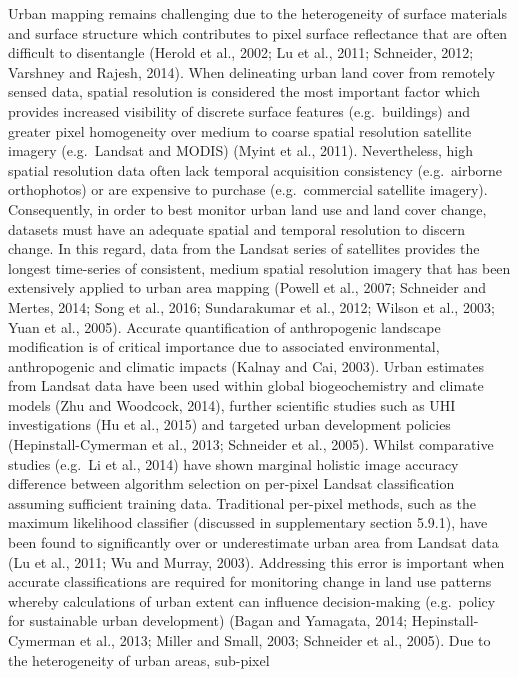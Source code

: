 \documentclass[]{book}
\begin{document}
Urban mapping remains challenging due to the heterogeneity of surface
materials and surface structure which contributes to pixel surface
reflectance that are often difficult to disentangle (Herold et al.,
2002; Lu et al., 2011; Schneider, 2012; Varshney and Rajesh, 2014). When
delineating urban land cover from remotely sensed data, spatial
resolution is considered the most important factor which provides
increased visibility of discrete surface features (e.g.~buildings) and
greater pixel homogeneity over medium to coarse spatial resolution
satellite imagery (e.g.~Landsat and MODIS) (Myint et al., 2011).
Nevertheless, high spatial resolution data often lack temporal
acquisition consistency (e.g.~airborne orthophotos) or are expensive to
purchase (e.g.~commercial satellite imagery). Consequently, in order to
best monitor urban land use and land cover change, datasets must have an
adequate spatial and temporal resolution to discern change. In this
regard, data from the Landsat series of satellites provides the longest
time-series of consistent, medium spatial resolution imagery that has
been extensively applied to urban area mapping (Powell et al., 2007;
Schneider and Mertes, 2014; Song et al., 2016; Sundarakumar et al.,
2012; Wilson et al., 2003; Yuan et al., 2005). Accurate quantification
of anthropogenic landscape modification is of critical importance due to
associated environmental, anthropogenic and climatic impacts (Kalnay and
Cai, 2003). Urban estimates from Landsat data have been used within
global biogeochemistry and climate models (Zhu and Woodcock, 2014),
further scientific studies such as UHI investigations (Hu et al., 2015)
and targeted urban development policies (Hepinstall-Cymerman et al.,
2013; Schneider et al., 2005). Whilst comparative studies (e.g.~Li et
al., 2014) have shown marginal holistic image accuracy difference
between algorithm selection on per-pixel Landsat classification assuming
sufficient training data. Traditional per-pixel methods, such as the
maximum likelihood classifier (discussed in supplementary section
5.9.1), have been found to significantly over or underestimate urban
area from Landsat data (Lu et al., 2011; Wu and Murray, 2003).
Addressing this error is important when accurate classifications are
required for monitoring change in land use patterns whereby calculations
of urban extent can influence decision-making (e.g.~policy for
sustainable urban development) (Bagan and Yamagata, 2014;
Hepinstall-Cymerman et al., 2013; Miller and Small, 2003; Schneider et
al., 2005). Due to the heterogeneity of urban areas, sub-pixel
\end{document}
